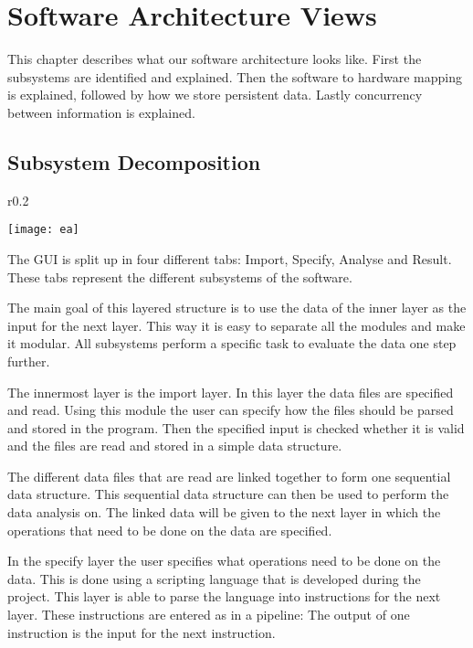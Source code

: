 \documentclass[a4paper,english,fleqn]{exam}
\begin{document}
\section{Software Architecture Views}
This chapter describes what our software architecture looks like. First the subsystems are identified and explained. Then the software to hardware mapping is explained, followed by how we store persistent data. Lastly concurrency between information is explained.

\subsection{Subsystem Decomposition}

\begin{wrapfigure}{r}{0.2\textwidth}
  \begin{center}
    \texttt{[image: ea]}
  \end{center}
\end{wrapfigure}

The GUI is split up in four different tabs: Import, Specify, Analyse and Result. These tabs represent the different subsystems of the software.

The main goal of this layered structure is to use the data of the inner layer as the input for the next layer. This way it is easy to separate all the modules and make it modular. All subsystems perform a specific task to evaluate the data one step further.

The innermost layer is the import layer. In this layer the data files are specified and read. Using this module the user can specify how the files should be parsed and stored in the program. Then the specified input is checked whether it is valid and the files are read and stored in a simple data structure. 

The different data files that are read are linked together to form one sequential data structure. This sequential data structure can then be used to perform the data analysis on. The linked data will be given to the next layer in which the operations that need to be done on the data are specified.

In the specify layer the user specifies what operations need to be done on the data. This is done using a scripting language that is developed during the project. This layer is able to parse the language into instructions for the next layer. These instructions are entered as in a pipeline: The output of one instruction is the input for the next instruction. 
\end{document}
